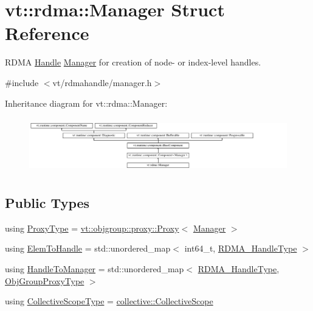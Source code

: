 \hypertarget{structvt_1_1rdma_1_1_manager}{}\section{vt\+:\+:rdma\+:\+:Manager Struct Reference}
\label{structvt_1_1rdma_1_1_manager}


R\+D\+MA \hyperlink{structvt_1_1rdma_1_1_handle}{Handle} \hyperlink{structvt_1_1rdma_1_1_manager}{Manager} for creation of node-\/ or index-\/level handles.  




{\ttfamily \#include $<$vt/rdmahandle/manager.\+h$>$}

Inheritance diagram for vt\+:\+:rdma\+:\+:Manager\+:\begin{figure}[H]
\begin{center}
\leavevmode
\includegraphics[height=2.430556cm]{structvt_1_1rdma_1_1_manager}
\end{center}
\end{figure}
\subsection*{Public Types}
\begin{DoxyCompactItemize}
\item 
using \hyperlink{structvt_1_1rdma_1_1_manager_a75d5cdc6428ea19f5ec665b04dcd7166}{Proxy\+Type} = \hyperlink{structvt_1_1objgroup_1_1proxy_1_1_proxy}{vt\+::objgroup\+::proxy\+::\+Proxy}$<$ \hyperlink{structvt_1_1rdma_1_1_manager}{Manager} $>$
\item 
using \hyperlink{structvt_1_1rdma_1_1_manager_ad794893058cec7595bc2bcb466ce7d3f}{Elem\+To\+Handle} = std\+::unordered\+\_\+map$<$ int64\+\_\+t, \hyperlink{namespacevt_a10442579ec4e7ebef223818e64bcf908}{R\+D\+M\+A\+\_\+\+Handle\+Type} $>$
\item 
using \hyperlink{structvt_1_1rdma_1_1_manager_aac6e7c58d320c302ea08461941d65f6e}{Handle\+To\+Manager} = std\+::unordered\+\_\+map$<$ \hyperlink{namespacevt_a10442579ec4e7ebef223818e64bcf908}{R\+D\+M\+A\+\_\+\+Handle\+Type}, \hyperlink{namespacevt_ad7cae989df485fccca57f0792a880a8e}{Obj\+Group\+Proxy\+Type} $>$
\item 
using \hyperlink{structvt_1_1rdma_1_1_manager_a7a5509b81547110f71aa85027520cfd5}{Collective\+Scope\+Type} = \hyperlink{structvt_1_1collective_1_1_collective_scope}{collective\+::\+Collective\+Scope}
\end{DoxyCompactItemize}

